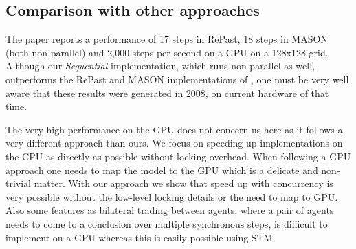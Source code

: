%

\subsection{Comparison with other approaches}
The paper \cite{lysenko_framework_2008} reports a performance of 17 steps in RePast, 18 steps in MASON (both non-parallel) and 2,000 steps per second on a GPU on a 128x128 grid. Although our \textit{Sequential} implementation, which runs non-parallel as well, outperforms the RePast and MASON implementations of \cite{lysenko_framework_2008}, one must be very well aware that these results were generated in 2008, on current hardware of that time.


The very high performance on the GPU does not concern us here as it follows a very different approach than ours. We focus on speeding up implementations on the CPU as directly as possible without locking overhead. When following a GPU approach one needs to map the model to the GPU which is a delicate and non-trivial matter. With our approach we show that speed up with concurrency is very possible without the low-level locking details or the need to map to GPU. Also some features as bilateral trading between agents, where a pair of agents needs to come to a conclusion over multiple synchronous steps, is difficult to implement on a GPU whereas this is easily possible using STM.

